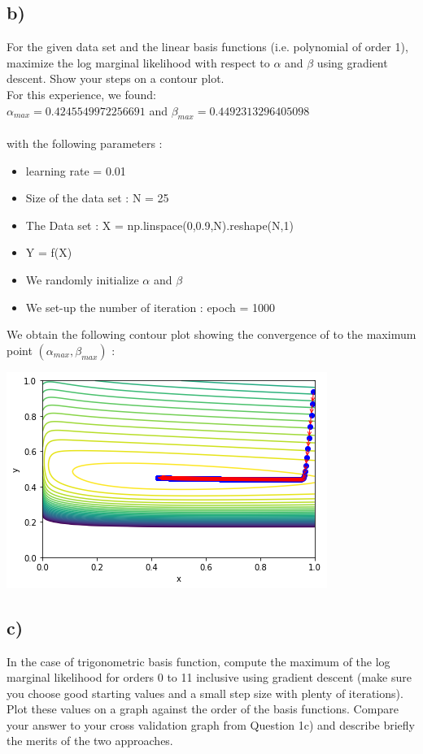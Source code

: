 \documentclass[12pt,twoside]{article}
\begin{document}
\subsection*{b)} For the given data set and the linear basis functions (i.e. polynomial of order 1), maximize the log marginal likelihood with respect to $\alpha$ and $\beta$ using gradient descent. Show your steps on a contour plot. \\

For this experience, we found: \\
$\alpha_{max} = 0.4245549972256691$ and $\beta_{max} = 0.4492313296405098$ \\ \\ with the following parameters : 
\begin{itemize}
	\item learning rate = 0.01
	\item Size of the data set : N = 25
	\item The Data set : X = np.linspace(0,0.9,N).reshape(N,1)
	\item Y = f(X)
	\item We randomly initialize $\alpha$ and $\beta$
	\item We set-up the number of iteration : epoch = 1000
\end{itemize}

We obtain the following contour plot showing the convergence of to the maximum point $(\alpha_{max}, \beta_{max})$ : 

\begin{center}
	\includegraphics{../contour_plot.png}	     
\end{center}

\subsection*{c)} In the case of trigonometric basis function, compute the maximum of the log marginal likelihood for orders 0 to 11 inclusive using gradient descent (make sure you choose good starting values and a small step size with plenty of iterations). Plot these values on a graph against the order of the basis functions. Compare your answer to your cross validation graph from Question 1c) and describe briefly the merits of the two approaches.
\end{document}
